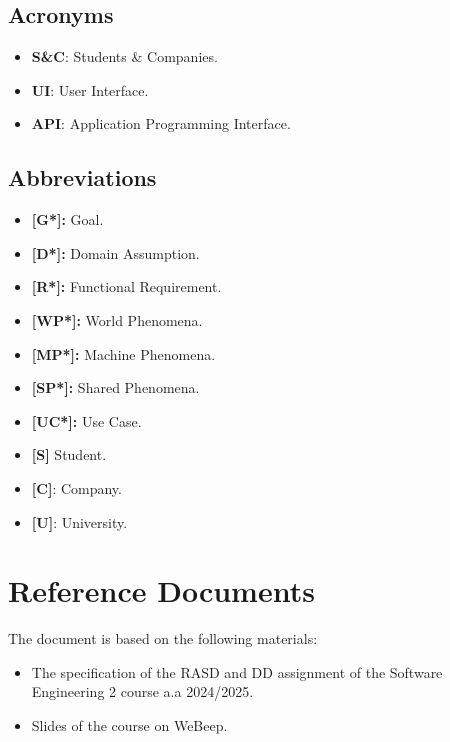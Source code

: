 \subsection{Acronyms}
\label{subsec:acronyms}%

\begin{itemize}
\item
  \textbf{S\&C}: Students \& Companies.
\item
  \textbf{UI}: User Interface.
\item
  \textbf{API}: Application Programming Interface.
\end{itemize}

\subsection{Abbreviations}
\label{subsec:abbreviations}%

\begin{itemize}
\item
  \textbf{[G*]:} Goal.
\item
  \textbf{[D*]:} Domain Assumption.
\item
  \textbf{[R*]:} Functional Requirement.
\item
  \textbf{[WP*]:} World Phenomena.
\item
  \textbf{[MP*]:} Machine Phenomena.
\item
  \textbf{[SP*]:} Shared Phenomena.
\item
  \textbf{[UC*]:} Use Case.
\item
  \textbf{[S]} Student.
\item
  \textbf{[C]}: Company.
\item
  \textbf{[U]}: University.
\end{itemize}




\section{Reference Documents}
\label{sec:reference_documents}%

The document is based on the following materials:

\begin{itemize}
\item
  The specification of the RASD and DD assignment of the Software Engineering 2 course a.a 2024/2025.
\item
  Slides of the course on WeBeep.
\end{itemize}

